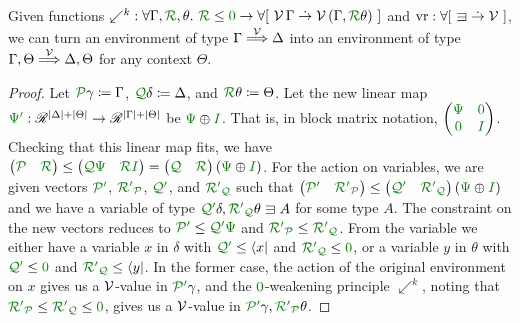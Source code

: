 \begin{lemma}[bind]\label{thm:lr-bind}
  Given functions
  ${\swarrow^k} : \forall \Gamma, \grR, \theta.~\grR \leq \gr0 \to
  \forallb{\V\,\Gamma \dotto \V\,\plr{\Gamma, \grR\theta}}$ and
  $\mathrm{vr} : \forallb{{\sqni} \dotto \V}$, we can turn an environment of
  type $\Gamma \stackrel{\mathcal V}\Longrightarrow \Delta$ into an environment of type
  $\Gamma, \Theta \stackrel{\mathcal V}\Longrightarrow \Delta, \Theta$ for any context $\Theta$.
\end{lemma}
\begin{proof}
  Let $\grP\gamma \coloneqq \Gamma$, $\grQ\delta \coloneqq \Delta$, and
  $\grR\theta \coloneqq \Theta$.
  Let the new linear map $\gr\Psi\gr' : \Ann^{\size\Delta + \size\Theta} \to
  \Ann^{\size\Gamma + \size\Theta}$ be $\gr\Psi \oplus \gr I$.
  That is, in block matrix notation,
  $\begin{pmatrix} \gr\Psi & \gr0 \\ \gr0 & \gr I \end{pmatrix}$.
  Checking that this linear map fits, we have
  $\begin{pmatrix}\grP & \grR\end{pmatrix}
  \leq \begin{pmatrix}\grQ\gr\Psi & \grR\gr I\end{pmatrix}
  = \begin{pmatrix}\grQ & \grR\end{pmatrix}\plr{\gr\Psi \oplus \gr I}$.
  For the action on variables, we are given vectors $\grPprime$,
  $\grR\gr'_\grP$, $\grQprime$, and $\grR\gr'_\grQ$ such that
  $\begin{pmatrix} \grPprime & \grR\gr'_\grP \end{pmatrix} \leq
  \begin{pmatrix} \grQprime & \grR\gr'_\grQ \end{pmatrix}
  \plr{\gr\Psi \oplus \gr I}$ and we have a variable of type
  $\grQprime\delta, \grR\gr'_\grQ\theta \sqni A$ for some type $A$.
  The constraint on the new vectors reduces to $\grPprime \leq \grQprime\gr\Psi$
  and $\grR\gr'_\grP \leq \grR\gr'_\grQ$.
  From the variable we either have a variable $x$ in $\delta$ with
  $\grQprime \leq \langle x \rvert$ and $\grR\gr'_\grQ \leq \gr0$, or a
  variable $y$ in $\theta$ with $\grQprime \leq \gr0$ and
  $\grR\gr'_\grQ \leq \langle y \rvert$.
  In the former case, the action of the original environment on $x$ gives us a
  $\mathcal V$-value in $\grPprime\gamma$, and the $\gr0$-weakening principle
  $\swarrow^k$, noting that $\grR\gr'_\grP \leq \grR\gr'_\grQ \leq \gr0$, gives
  us a $\mathcal V$-value in $\grPprime\gamma, \grR\gr'_\grP\theta$.

\end{proof}
